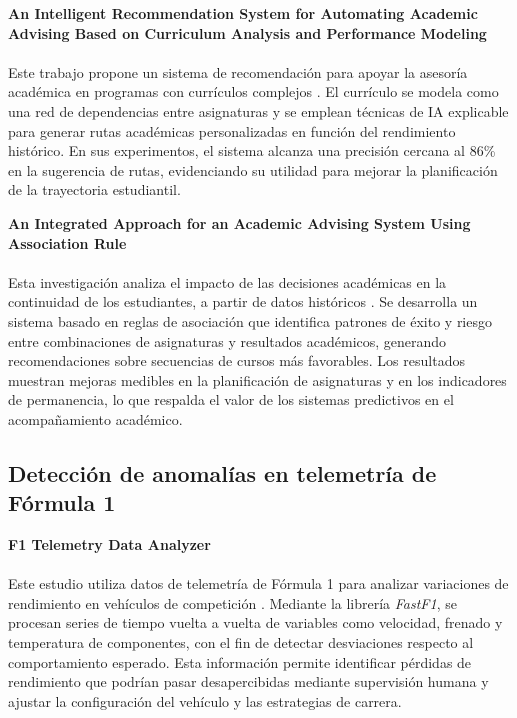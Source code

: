 \textbf{An Intelligent Recommendation System for Automating Academic Advising Based on Curriculum Analysis and Performance Modeling} \\\\
Este trabajo propone un sistema de recomendación para apoyar la asesoría académica en programas con currículos complejos \cite{sistema_recomendacion_academica}. El currículo se modela como una red de dependencias entre asignaturas y se emplean técnicas de IA explicable para generar rutas académicas personalizadas en función del rendimiento histórico. En sus experimentos, el sistema alcanza una precisión cercana al 86\% en la sugerencia de rutas, evidenciando su utilidad para mejorar la planificación de la trayectoria estudiantil.

\textbf{An Integrated Approach for an Academic Advising System Using Association Rule} \\\\
Esta investigación analiza el impacto de las decisiones académicas en la continuidad de los estudiantes, a partir de datos históricos \cite{alghamdi_academic_2024}. Se desarrolla un sistema basado en reglas de asociación que identifica patrones de éxito y riesgo entre combinaciones de asignaturas y resultados académicos, generando recomendaciones sobre secuencias de cursos más favorables. Los resultados muestran mejoras medibles en la planificación de asignaturas y en los indicadores de permanencia, lo que respalda el valor de los sistemas predictivos en el acompañamiento académico.

\subsection{Detección de anomalías en telemetría de Fórmula 1}

\textbf{F1 Telemetry Data Analyzer} \\\\
Este estudio utiliza datos de telemetría de Fórmula 1 para analizar variaciones de rendimiento en vehículos de competición \cite{f1_telemetry}. Mediante la librería \textit{FastF1}, se procesan series de tiempo vuelta a vuelta de variables como velocidad, frenado y temperatura de componentes, con el fin de detectar desviaciones respecto al comportamiento esperado. Esta información permite identificar pérdidas de rendimiento que podrían pasar desapercibidas mediante supervisión humana y ajustar la configuración del vehículo y las estrategias de carrera.

